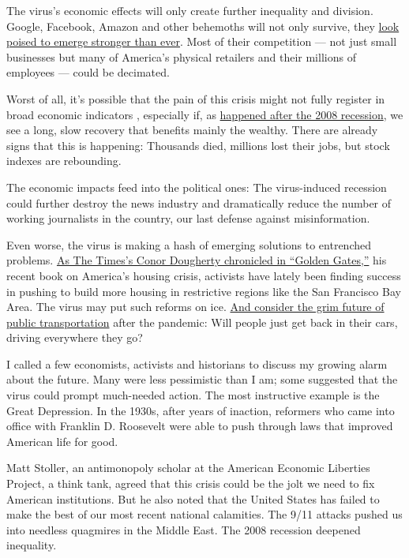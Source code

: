 The virus's economic effects will only create further inequality and
division. Google, Facebook, Amazon and other behemoths will not only
survive, they
\href{https://www.nytimes3xbfgragh.onion/2020/03/23/technology/coronavirus-facebook-amazon-youtube.html}{look
poised to emerge stronger than ever}. Most of their competition --- not
just small businesses but many of America's physical retailers and their
millions of employees --- could be decimated.

Worst of all, it's possible that the pain of this crisis might not fully
register in broad economic indicators , especially if, as
\href{https://www.nytimes3xbfgragh.onion/2019/09/18/opinion/obama-2008-financial-crisis.html}{happened
after the 2008 recession}, we see a long, slow recovery that benefits
mainly the wealthy. There are already signs that this is happening:
Thousands died, millions lost their jobs, but stock indexes are
rebounding.

The economic impacts feed into the political ones: The virus-induced
recession could further destroy the news industry and dramatically
reduce the number of working journalists in the country, our last
defense against misinformation.

Even worse, the virus is making a hash of emerging solutions to
entrenched problems.
\href{https://www.nytimes3xbfgragh.onion/2020/02/14/books/review/golden-gates-housing-conor-dougherty.html}{As
The Times's Conor Dougherty chronicled in ``Golden Gates,''} his recent
book on America's housing crisis, activists have lately been finding
success in pushing to build more housing in restrictive regions like the
San Francisco Bay Area. The virus may put such reforms on ice.
\href{https://qz.com/1824243/coronavirus-has-killed-off-public-transportation-across-the-world/}{And
consider the grim future of public transportation} after the pandemic:
Will people just get back in their cars, driving everywhere they go?

I called a few economists, activists and historians to discuss my
growing alarm about the future. Many were less pessimistic than I am;
some suggested that the virus could prompt much-needed action. The most
instructive example is the Great Depression. In the 1930s, after years
of inaction, reformers who came into office with Franklin D. Roosevelt
were able to push through laws that improved American life for good.

Matt Stoller, an antimonopoly scholar at the American Economic Liberties
Project, a think tank, agreed that this crisis could be the jolt we need
to fix American institutions. But he also noted that the United States
has failed to make the best of our most recent national calamities. The
9/11 attacks pushed us into needless quagmires in the Middle East. The
2008 recession deepened inequality.

